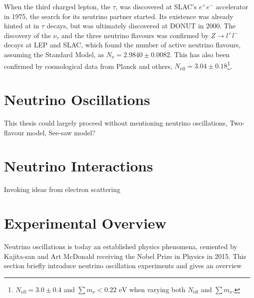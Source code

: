 When the third charged lepton, the $\tau$, was discovered at SLAC's $e^+e^-$ accelerator in 1975\cite{tau_disc}, the search for its neutrino partner started. Its existence was already hinted at in $\tau$ decays, but was ultimately discovered at DONUT\cite{tau_nu_disc} in 2000. The discovery of the $\nu_\tau$ and the three neutrino flavours was confirmed by $Z \rightarrow l^+ l^-$ decays at LEP and SLAC\cite{lep}, which found the number of active neutrino flavours, assuming the Standard Model, as $N_\nu = 2.9840\pm0.0082$. This has also been confirmed by cosmological data from Planck and others\cite{planck}, $N_\text{eff} = 3.04\pm0.18$\footnote{$N_\text{eff}=3.0\pm0.4$ and $\sum m_\nu < 0.22 \text{ eV}$ when varying both $N_\text{eff}$ and $\sum m_\nu$.}.

\section{Neutrino Oscillations}
\label{sec:theory:osc}
This thesis could largely proceed without mentioning neutrino oscillations, Two-flavour model, See-saw model?

\section{Neutrino Interactions}
\label{sec:theory:int}
Invoking ideas from electron scattering

\section{Experimental Overview}
Neutrino oscillations is today an established physics phenomena, cemented by Kajita-san and Art McDonald receiving the Nobel Prize in Physics in 2015. This section briefly introduce neutrino oscillation experiments and gives an overview

